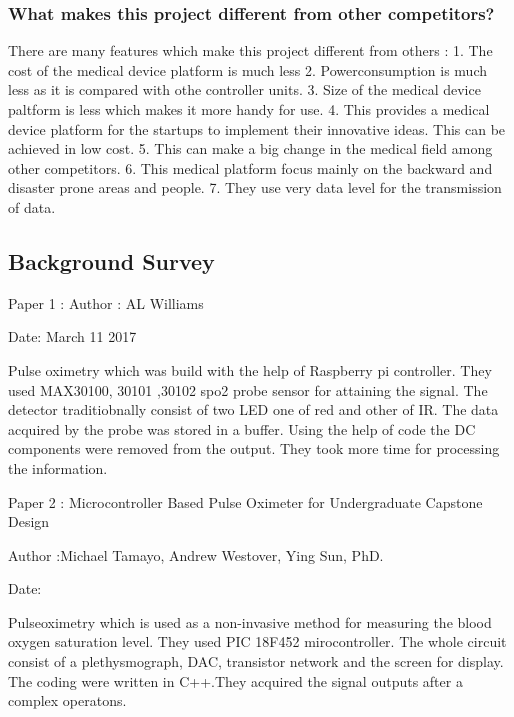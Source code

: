 
\subsubsection{What makes this project different from other competitors?}

There are many features which make this project different from others :
1. The cost of the medical device platform is much less
2. Powerconsumption is much less as it is compared with othe controller units.
3. Size of the medical device paltform is less which makes it more handy for use.
4. This provides a medical device platform for the startups to implement their innovative ideas. This can be achieved in low cost.
5. This can make a big change in the medical field among other competitors.
6. This medical platform focus mainly on the backward and disaster prone areas and people.
7. They use very data level for the transmission of data.   


\subsection{Background Survey}

Paper 1 : 
Author  : AL Williams  

Date: March 11 2017 
 
Pulse oximetry which was build with the help of Raspberry pi controller. They used MAX30100, 30101 ,30102  spo2 probe sensor for attaining the signal. The detector traditiobnally consist of two LED one of red and other of IR. 
The data acquired by the probe was stored in a buffer. Using the help of code the DC components were removed from the output. 
They took more time for processing the information. 

Paper 2 :  Microcontroller Based Pulse Oximeter for Undergraduate Capstone Design

Author  :Michael Tamayo, Andrew Westover, Ying Sun, PhD.

Date: 

Pulseoximetry which is used as a non-invasive method for measuring the blood oxygen saturation level. They used PIC 18F452  mirocontroller. The whole circuit consist of a plethysmograph, DAC, transistor network and the screen for display. The coding were written in C++.They acquired the signal outputs after a complex operatons.  

